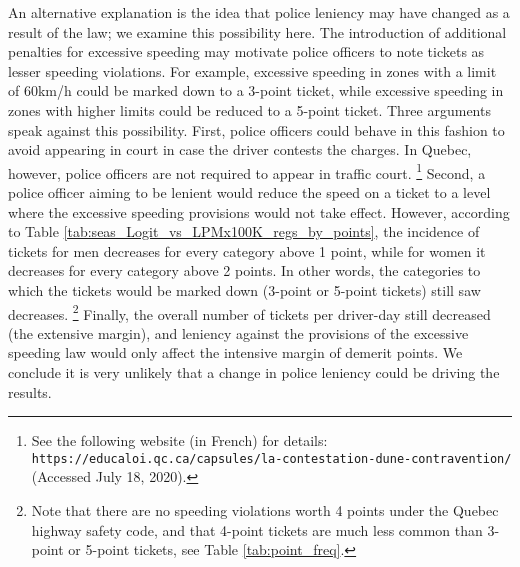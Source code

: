 An alternative explanation is the idea that police leniency may have changed as a result of the law; 
we examine this possibility here. 
The introduction of additional penalties for excessive speeding may 
motivate police officers to note tickets as lesser speeding violations. 
For example, excessive speeding in zones with a limit of 60km/h 
could be marked down to a 3-point ticket, 
while excessive speeding in zones with higher limits could be reduced to a 5-point ticket. 
Three arguments speak against this possibility. 
First, police officers could behave in this fashion to avoid appearing in court 
in case the driver contests the charges.  
In Quebec, however, police officers are not required to appear in traffic court.%
\footnote{%
See the following website (in French) for details: \texttt{https://educaloi.qc.ca/capsules/la-contestation-dune-contravention/} (Accessed July 18, 2020).}  
%
Second, a police officer aiming to be lenient would reduce the speed on a ticket 
to a level where the excessive speeding provisions would not take effect. 
However, according to 
Table \ref{tab:seas_Logit_vs_LPMx100K_regs_by_points}, 
the incidence of tickets for men decreases for every category above 1 point, 
while for women it decreases for every category above 2 points. 
In other words, the categories to which the tickets would be marked down (3-point or 5-point tickets) still saw decreases.%
\footnote{%
Note that there are no speeding violations worth 4 points under the Quebec highway safety code, and that 4-point tickets are much less common than 3-point or 5-point tickets, see 
Table \ref{tab:point_freq}.
}
% 
Finally, the overall number of tickets per driver-day still decreased (the extensive margin), 
and leniency against the provisions of the excessive speeding law 
would only affect the intensive margin of demerit points. 
We conclude it is very unlikely that a change in police leniency could be driving the results.





